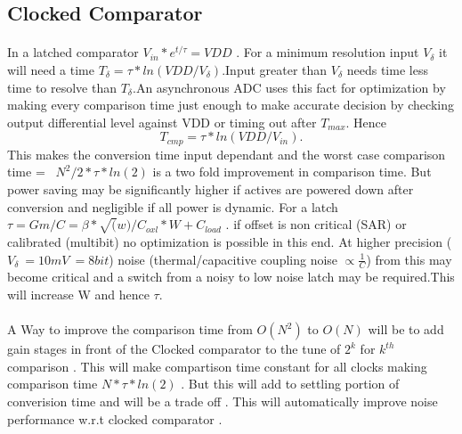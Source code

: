 \documentclass[a4paper,10pt,fleqn,titlepage,twoside]{article}
\begin{document}
\subsection*{Clocked Comparator}
\paragraph{}
	In a latched comparator $V_{in}*e^{t/\tau}=VDD$ . For a minimum resolution input $V_{\delta}$ it will need a time $T_{\delta}  = \tau*ln(VDD/V_{\delta})
$.Input greater than $V_{\delta}$ needs time less time to resolve than $T_{\delta}$.An asynchronous ADC uses this fact for optimization by making every comparison time just enough to make
accurate decision by checking output differential level against VDD or timing out after $T_{max}$. Hence $$T_{cmp}=\tau*ln(VDD/V_{in}).$$ This makes the conversion time input dependant and the worst case
comparison time =~ $N^2/2*\tau*ln(2)$ is a two fold improvement in comparison time. But power saving may be significantly higher if actives are powered down after conversion and negligible if all power is dynamic.
For a latch $\tau = Gm/C = \beta*\sqrt(w)/C_{oxl}*W +C_{load}$ . if offset is non critical (SAR) or calibrated (multibit) no optimization is possible in this
end. At higher precision ($V_\delta~=10mV~=8bit$) noise (thermal/capacitive coupling noise $\propto \frac{1}{C}$) from this may become critical and a switch from a noisy to low noise
latch may be required.This will increase W and hence $\tau$.
\paragraph{}
	A Way to improve the comparison time from $O(N^2)$ to $O(N)$ will be to add gain stages in front of the Clocked comparator to the tune of $2^k$ for $k^{th}$ comparison . This will make compartison time 
constant for all clocks making comparison time $N*\tau*ln(2)$ . But this will add to settling portion of converision time and will be a trade off . 
This will automatically improve noise performance w.r.t clocked comparator . 
\end{document}
